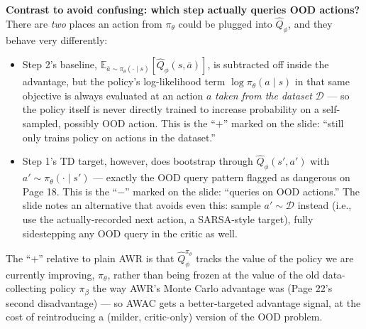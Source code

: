 \textbf{Contrast to avoid confusing: which step actually queries OOD actions?} There are \emph{two} places an action from $\pi_\theta$ could be plugged into $\hat Q_\phi$, and they behave very differently:
\begin{itemize}
\item Step 2's baseline, $\mathbb{E}_{\bar a\sim\pi_\theta(\cdot\mid s)}[\hat Q_\phi(s,\bar a)]$, is subtracted off inside the advantage, but the policy's log-likelihood term $\log\pi_\theta(a\mid s)$ in that same objective is always evaluated at an action $a$ \emph{taken from the dataset} $\mathcal D$ --- so the policy itself is never directly trained to increase probability on a self-sampled, possibly OOD action. This is the ``$+$'' marked on the slide: ``still only trains policy on actions in the dataset.''
\item Step 1's TD target, however, does bootstrap through $\hat Q_\phi(s',a')$ with $a'\sim\pi_\theta(\cdot\mid s')$ --- exactly the OOD query pattern flagged as dangerous on Page 18. This is the ``$-$'' marked on the slide: ``queries on OOD actions.'' The slide notes an alternative that avoids even this: sample $a' \sim \mathcal D$ instead (i.e., use the actually-recorded next action, a SARSA-style target), fully sidestepping any OOD query in the critic as well.
\end{itemize}
The ``$+$'' relative to plain AWR is that $\hat Q^{\pi_\theta}_\phi$ tracks the value of the policy we are currently improving, $\pi_\theta$, rather than being frozen at the value of the old data-collecting policy $\pi_\beta$ the way AWR's Monte Carlo advantage was (Page 22's second disadvantage) --- so AWAC gets a better-targeted advantage signal, at the cost of reintroducing a (milder, critic-only) version of the OOD problem.
